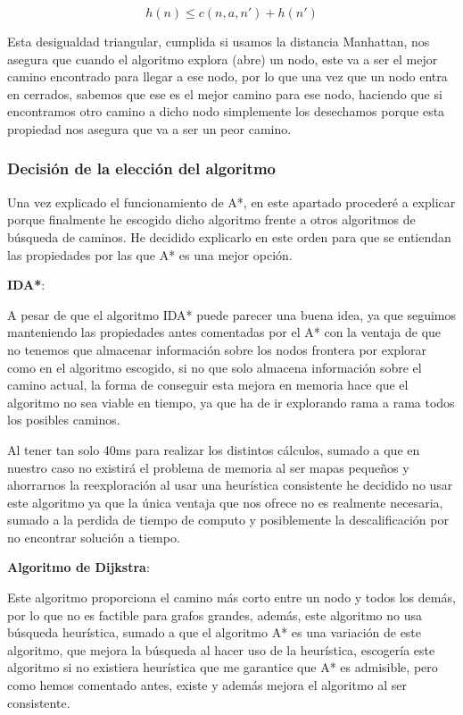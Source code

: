 \documentclass[10pt, spanish]{article}
\begin{document}
$$ h(n) \leq c(n, a, n') + h(n') $$

Esta desigualdad triangular, cumplida si usamos la distancia Manhattan, nos asegura que cuando el algoritmo explora (abre) un nodo, este va a ser el mejor camino encontrado para llegar a ese nodo, por lo que una vez que un nodo entra en cerrados, sabemos que ese es el mejor camino para ese nodo, haciendo que si encontramos otro camino a dicho nodo simplemente los desechamos porque esta propiedad nos asegura que va a ser un peor camino.


\subsubsection{Decisión de la elección del algoritmo}

Una vez explicado el funcionamiento de A*, en este apartado procederé a explicar porque finalmente he escogido dicho algoritmo frente a otros algoritmos de búsqueda de caminos. He decidido explicarlo en este orden para que se entiendan las propiedades por las que A* es una mejor opción.

\textbf{IDA*}:

A pesar de que el algoritmo IDA* puede parecer una buena idea, ya que seguimos manteniendo las propiedades antes comentadas por el A* con la ventaja de que no tenemos que almacenar información sobre los nodos frontera por explorar como en el algoritmo escogido, si no que solo almacena información sobre el camino actual, la forma de conseguir esta mejora en memoria hace que el algoritmo no sea viable en tiempo, ya que ha de ir explorando rama a rama todos los posibles caminos.

Al tener tan solo 40ms para realizar los distintos cálculos, sumado a que en nuestro caso no existirá el problema de memoria al ser mapas pequeños y ahorrarnos la reexploración al usar una heurística consistente he decidido no usar este algoritmo ya que la única ventaja que nos ofrece no es realmente necesaria, sumado a la perdida de tiempo de computo y posiblemente la descalificación por no encontrar solución a tiempo.

\textbf{Algoritmo de Dijkstra}:

Este algoritmo proporciona el camino más corto entre un nodo y todos los demás, por lo que no es factible para grafos grandes, además, este algoritmo no usa búsqueda heurística, sumado a que el algoritmo A* es una variación de este algoritmo, que mejora la búsqueda al hacer uso de la heurística, escogería este algoritmo si no existiera heurística que me garantice que A* es admisible, pero como hemos comentado antes, existe y además mejora el algoritmo al ser consistente.
\end{document}
